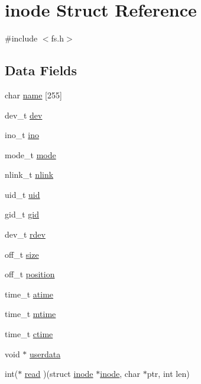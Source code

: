 \hypertarget{structinode}{\section{inode Struct Reference}
\label{structinode}
}


{\ttfamily \#include $<$fs.\+h$>$}

\subsection*{Data Fields}
\begin{DoxyCompactItemize}
\item 
char \hyperlink{structinode_ad64802d9d4ebdd1c56af5ab6e302faf0}{name} \mbox{[}255\mbox{]}
\item 
dev\+\_\+t \hyperlink{structinode_a127a2eb030df332fa64a81188731ad6b}{dev}
\item 
ino\+\_\+t \hyperlink{structinode_a1a77be0f24a6c9a18bbdbcecfb75df7c}{ino}
\item 
mode\+\_\+t \hyperlink{structinode_a4902d9f6a1d7bd79c6f1bb73d83ce8e3}{mode}
\item 
nlink\+\_\+t \hyperlink{structinode_a1daedc820c86b5af32f0a137419f7a8f}{nlink}
\item 
uid\+\_\+t \hyperlink{structinode_a0eac94e96ded19029e871d5cce815bcb}{uid}
\item 
gid\+\_\+t \hyperlink{structinode_a8434fb9dd05057d00b37ed713713835d}{gid}
\item 
dev\+\_\+t \hyperlink{structinode_a3e7613383954ff7b5faf7c2188e1f61b}{rdev}
\item 
off\+\_\+t \hyperlink{structinode_a53722b1b60b7136ce0204b66527bb400}{size}
\item 
off\+\_\+t \hyperlink{structinode_a5756f61233e40d01652094d29b5daf6c}{position}
\item 
time\+\_\+t \hyperlink{structinode_a7e52661a115f6def97778566f2be0d80}{atime}
\item 
time\+\_\+t \hyperlink{structinode_a19f0d407fa2962c942e406d3e00c1da4}{mtime}
\item 
time\+\_\+t \hyperlink{structinode_a27334a9d3c25fbac1c134ed5b9cbc566}{ctime}
\item 
void $\ast$ \hyperlink{structinode_a8ba627a7ebbacc723e8452fbf8dd3670}{userdata}
\item 
int($\ast$ \hyperlink{structinode_ae2c5e8a0a372334b97024fbd9ef694c1}{read} )(struct \hyperlink{structinode}{inode} $\ast$\hyperlink{structinode}{inode}, char $\ast$ptr, int len)
\item 

\end{DoxyCompactItemize}
